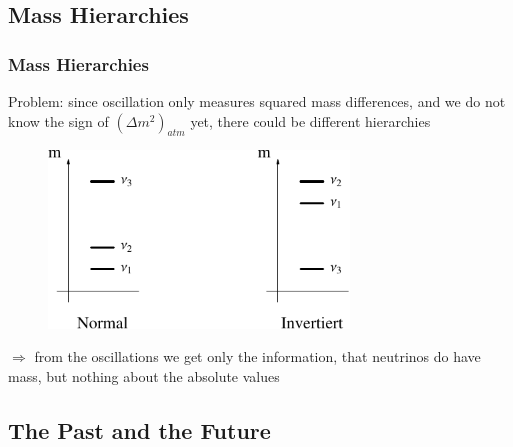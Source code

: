 \documentclass{beamer}
\begin{document}
\subsection{Mass Hierarchies}
\begin{frame}
	\frametitle{Mass Hierarchies}

Problem: since oscillation only measures squared mass differences, and we do not know the sign of $(\Delta
m^2)_{atm}$ yet, there could be different hierarchies


\begin{figure}
    \begin{center}
      \includegraphics[width=8cm]{fig/hierarchy.pdf}
    \end{center}
 \end{figure}

$\Rightarrow$ from the oscillations we get only the information, that neutrinos do have mass, but nothing about the absolute values

\end{frame}


\subsection{The Past and the Future}
\end{document}
